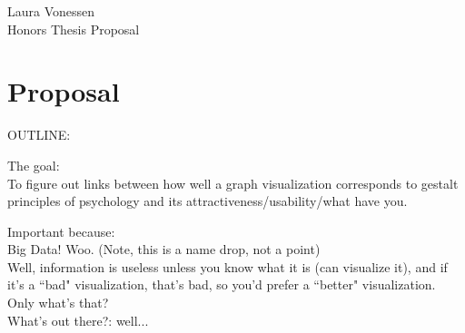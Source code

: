 \documentclass[12pt]{article}
\begin{document}
{\raggedleft 
	Laura Vonessen\\
	Honors Thesis Proposal\\ 
}


\begin{comment}
Thesis proposal guidelines:
•	Clearly describe:
	o	Topic
			Why of interest to you and other scholars/researchers
			Relevance and importance
			Comparison to existing resources
	o	Form
			E.g. Research paper, empirical/observed research in lab, creative (poetry, etc.), other (community event, etc.), or combo
	o	How goals will be reached (presumably with goals themselves?)
	o	Depending on category, focus on:
			Science: questions/hypotheses, methods, theoretical/methodological framework
			•	Research methods/resources (e.g. library, archival, survey, interview…)
			Creative: Plan, importance to self, relevance to discipline (note: thesis itself will require written summary of product and process)
			•	Work involved
			•	Outcome/result
			•	Incorporation of analysis into final product
•	Include syllabus
	o	“aspirational learning outcomes” (now there’s a phrase that has never seen reality)
	o	(Expected) reading/lab/field work per semester
	o	(Expected) student/advisor meetings
	o	Expected work products (program plus paper, or something like?)
	o	Criteria for evaluation and grading
•	Prospectus bureaucracy
	o	1-2 pages plus possible bibliography
	o	Due May 6, 2015
	o	Form requires both student and advisor signatures (good luck)
	o	For humans, get research permissions
\end{comment}

\section{Proposal}

OUTLINE:

The goal:\\
To figure out links between how well a graph visualization corresponds to gestalt principles of psychology and its attractiveness/usability/what have you.

Important because:\\
Big Data! Woo. (Note, this is a name drop, not a point)\\
Well, information is useless unless you know what it is (can visualize it), and if it's a ``bad" visualization, that's bad, so you'd prefer a ``better" visualization. Only what's that?\\
What's out there?: well...
\end{document}
